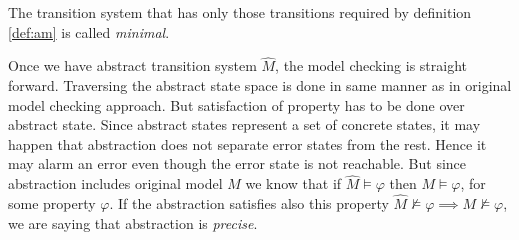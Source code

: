 \noindent
The transition system that has only those transitions required by definition \autoref{def:am} is called
\emph{minimal}.

Once we have abstract transition system $\widehat{M}$, the model checking is
straight forward. Traversing the abstract state space is done in same manner as
in original model checking approach. But satisfaction of property has to be done
over abstract state. Since abstract states represent a set of concrete states,
it may happen that abstraction does not separate error states from the rest.
Hence it may alarm an error even though the error state is not reachable.
But since abstraction includes original model $M$ we know that if $\widehat{M} \models \varphi$
then $M \models \varphi$, for some property $\varphi$. If the abstraction satisfies
also this property $\widehat{M} \not\models \varphi \implies M \not\models \varphi$,
we are saying that abstraction is \emph{precise}.
